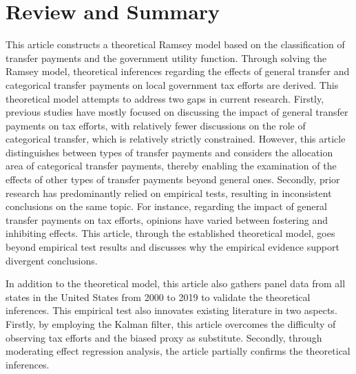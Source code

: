 

\section{Review and Summary}

This article constructs a theoretical Ramsey model based on the classification of transfer payments and the government utility function. Through solving the Ramsey model, theoretical inferences regarding the effects of general transfer and categorical transfer payments on local government tax efforts are derived. This theoretical model attempts to address two gaps in current research. Firstly, previous studies have mostly focused on discussing the impact of general transfer payments on tax efforts, with relatively fewer discussions on the role of categorical transfer, which is relatively strictly constrained. However, this article distinguishes between types of transfer payments and considers the allocation area of categorical transfer payments, thereby enabling the examination of the effects of other types of transfer payments beyond general ones. Secondly, prior research has predominantly relied on empirical tests, resulting in inconsistent conclusions on the same topic. For instance, regarding the impact of general transfer payments on tax efforts, opinions have varied between fostering and inhibiting effects. This article, through the established theoretical model, goes beyond empirical test results and discusses why the empirical evidence support divergent conclusions.

In addition to the theoretical model, this article also gathers panel data from all states in the United States from 2000 to 2019 to validate the theoretical inferences. This empirical test also innovates existing literature in two aspects. Firstly, by employing the Kalman filter, this article overcomes the difficulty of observing tax efforts and the biased proxy as substitute. Secondly, through moderating effect regression analysis, the article partially confirms the theoretical inferences.


